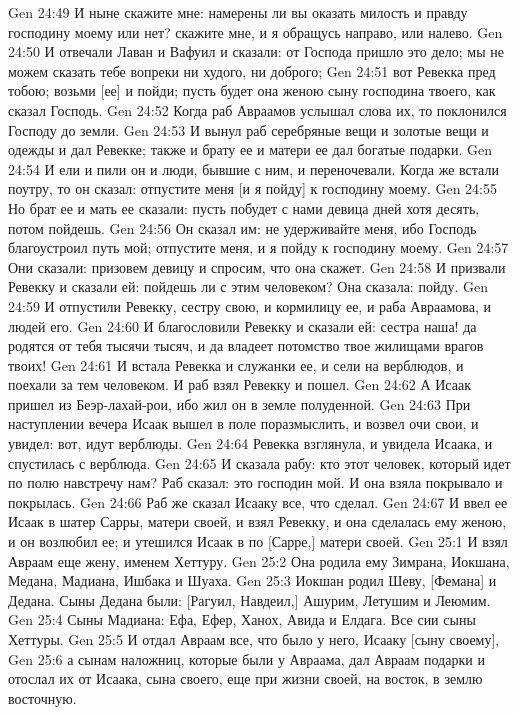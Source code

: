 \vs Gen 24:49 И ныне скажите мне: намерены ли вы оказать милость и правду господину моему или нет? скажите мне, и я обращусь направо, или налево.
\vs Gen 24:50 И отвечали Лаван и Вафуил и сказали: от Господа пришло это дело; мы не можем сказать тебе вопреки ни худого, ни доброго;
\vs Gen 24:51 вот Ревекка пред тобою; возьми [ее] и пойди; пусть будет она женою сыну господина твоего, как сказал Господь.
\vs Gen 24:52 Когда раб Авраамов услышал слова их, то поклонился Господу до земли.
\vs Gen 24:53 И вынул раб серебряные вещи и золотые вещи и одежды и дал Ревекке; также и брату ее и матери ее дал богатые подарки.
\vs Gen 24:54 И ели и пили он и люди, бывшие с ним, и переночевали. Когда же встали поутру, то он сказал: отпустите меня [и я пойду] к господину моему.
\vs Gen 24:55 Но брат ее и мать ее сказали: пусть побудет с нами девица дней хотя десять, потом пойдешь.
\vs Gen 24:56 Он сказал им: не удерживайте меня, ибо Господь благоустроил путь мой; отпустите меня, и я пойду к господину моему.
\vs Gen 24:57 Они сказали: призовем девицу и спросим, что она скажет.
\vs Gen 24:58 И призвали Ревекку и сказали ей: пойдешь ли с этим человеком? Она сказала: пойду.
\vs Gen 24:59 И отпустили Ревекку, сестру свою, и кормилицу ее, и раба Авраамова, и людей его.
\vs Gen 24:60 И благословили Ревекку и сказали ей: сестра наша! да родятся от тебя тысячи тысяч, и да владеет потомство твое жилищами врагов твоих!
\vs Gen 24:61 И встала Ревекка и служанки ее, и сели на верблюдов, и поехали за тем человеком. И раб взял Ревекку и пошел.
\vs Gen 24:62 А Исаак пришел из Беэр-лахай-рои, ибо жил он в земле полуденной.
\vs Gen 24:63 При наступлении вечера Исаак вышел в поле поразмыслить, и возвел очи свои, и увидел: вот, идут верблюды.
\vs Gen 24:64 Ревекка взглянула, и увидела Исаака, и спустилась с верблюда.
\vs Gen 24:65 И сказала рабу: кто этот человек, который идет по полю навстречу нам? Раб сказал: это господин мой. И она взяла покрывало и покрылась.
\vs Gen 24:66 Раб же сказал Исааку все, что сделал.
\vs Gen 24:67 И ввел ее Исаак в шатер Сарры, матери своей, и взял Ревекку, и она сделалась ему женою, и он возлюбил ее; и утешился Исаак в  по [Сарре,] матери своей.
\vs Gen 25:1 И взял Авраам еще жену, именем Хеттуру.
\vs Gen 25:2 Она родила ему Зимрана, Иокшана, Медана, Мадиана, Ишбака и Шуаха.
\vs Gen 25:3 Иокшан родил Шеву, [Фемана] и Дедана. Сыны Дедана были: [Рагуил, Навдеил,] Ашурим, Летушим и Леюмим.
\vs Gen 25:4 Сыны Мадиана: Ефа, Ефер, Ханох, Авида и Елдага. Все сии сыны Хеттуры.
\vs Gen 25:5 И отдал Авраам все, что было у него, Исааку [сыну своему],
\vs Gen 25:6 а сынам наложниц, которые были у Авраама, дал Авраам подарки и отослал их от Исаака, сына своего, еще при жизни своей, на восток, в землю восточную.
